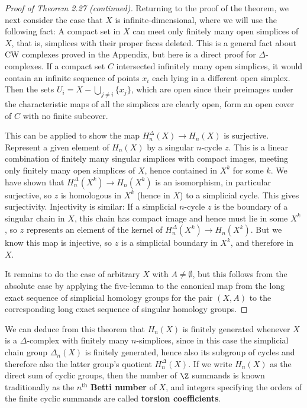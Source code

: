 \begin{proof}[Proof of Theorem 2.27 (continued)]
Returning to the proof of the theorem, we next consider the case that $X$ is infinite-dimensional, where we will use the following fact: A compact set in $X$ can meet only finitely many open simplices of $X$, that is, simplices with their proper faces deleted. This is a general fact about CW complexes proved in the Appendix, but here is a direct proof for $\Delta$-complexes. If a compact set $C$ intersected infinitely many open simplices, it would contain an infinite sequence of points $x_i$ each lying in a different open simplex. Then the sets $U_i = X - \bigcup_{j \ne i} \{x_j\}$, which are open since their preimages under the characteristic maps of all the simplices are clearly open, form an open cover of $C$ with no finite subcover.

This can be applied to show the map $H_n^\Delta(X) \to H_n(X)$ is surjective. Represent a given element of $H_n(X)$ by a singular $n$-cycle $z$. This is a linear combination of finitely many singular simplices with compact images, meeting only finitely many open simplices of $X$, hence contained in $X^k$ for some $k$. We have shown that $H_n^\Delta(X^k) \to H_n(X^k)$ is an isomorphism, in particular surjective, so $z$ is homologous in $X^k$ (hence in $X$) to a simplicial cycle. This gives surjectivity. Injectivity is similar: If a simplicial $n$-cycle $z$ is the boundary of a singular chain in $X$, this chain has compact image and hence must lie in some $X^k$, so $z$ represents an element of the kernel of $H_n^\Delta(X^k) \to H_n(X^k)$. But we know this map is injective, so $z$ is a simplicial boundary in $X^k$, and therefore in $X$.

It remains to do the case of arbitrary $X$ with $A \ne \emptyset$, but this follows from the absolute case by applying the five-lemma to the canonical map from the long exact sequence of simplicial homology groups for the pair $(X, A)$ to the corresponding long exact sequence of singular homology groups.
\end{proof}

We can deduce from this theorem that $H_n(X)$ is finitely generated whenever $X$
is a $\Delta$-complex with finitely many $n$-simplices, since in this case the simplicial chain
group $\Delta_n(X)$ is finitely generated, hence also its subgroup of cycles and therefore
also the latter group's quotient $H_n^\Delta(X)$. If we write $H_n(X)$ as the direct sum of cyclic
groups, then the number of $\Z$ summands is known traditionally as the $n^{\text{th}}$ \textbf{Betti
number} of $X$, and integers specifying the orders of the finite cyclic summands are
called \textbf{torsion coefficients}.

